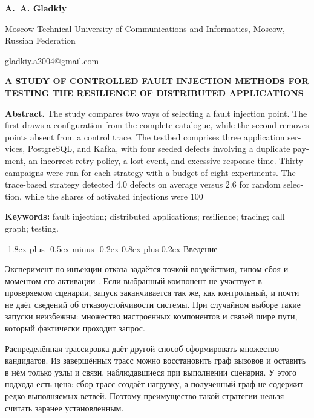 \documentclass[10pt,a4paper]{article}
\makeatletter
\renewcommand\section{\@startsection{section}{1}{\z@}%
  {-1.8ex plus -0.5ex minus -0.2ex}%
  {0.8ex plus 0.2ex}%
  {\normalfont\Large\bfseries}}
\makeatother
\begin{document}
\begin{english}
\begin{center}
  {\bfseries A. A. Gladkiy}\par
  Moscow Technical University of Communications and Informatics, Moscow, Russian Federation\par
  \href{mailto:gladkiy.a2004@gmail.com}{gladkiy.a2004@gmail.com}

  \vspace{0.8em}
  {\bfseries A STUDY OF CONTROLLED FAULT INJECTION METHODS FOR TESTING THE RESILIENCE OF DISTRIBUTED APPLICATIONS}
\end{center}

\noindent\textbf{Abstract.}
The study compares two ways of selecting a fault injection point. The first draws a configuration from the complete catalogue, while the second removes points absent from a control trace. The testbed comprises three application services, PostgreSQL, and Kafka, with four seeded defects involving a duplicate payment, an incorrect retry policy, a lost event, and excessive response time. Thirty campaigns were run for each strategy with a budget of eight experiments. The trace-based strategy detected 4.0 defects on average versus 2.6 for random selection, while the shares of activated injections were 100%

\noindent\textbf{Keywords:}
fault injection; distributed applications; resilience; tracing; call graph; testing.
\end{english}

\section{Введение}

Эксперимент по инъекции отказа задаётся точкой воздействия, типом сбоя и моментом его активации \cite{basiri2016}. Если выбранный компонент не участвует в проверяемом сценарии, запуск заканчивается так же, как контрольный, и почти не даёт сведений об отказоустойчивости системы. При случайном выборе такие запуски неизбежны: множество настроенных компонентов и связей шире пути, который фактически проходит запрос.

Распределённая трассировка даёт другой способ сформировать множество кандидатов. Из завершённых трасс можно восстановить граф вызовов и оставить в нём только узлы и связи, наблюдавшиеся при выполнении сценария. У этого подхода есть цена: сбор трасс создаёт нагрузку, а полученный граф не содержит редко выполняемых ветвей. Поэтому преимущество такой стратегии нельзя считать заранее установленным.
\end{document}
